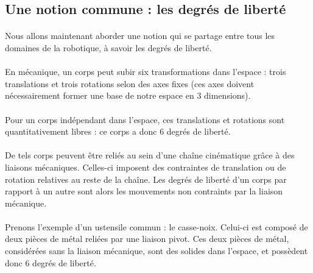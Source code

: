 \documentclass[a4paper,10pt]{article}
\begin{document}
                    
        \subsection{Une notion commune : les degrés de liberté}
            \paragraph{}
                Nous allons maintenant aborder une notion qui se partage 
                entre tous les domaines de la robotique, à savoir les degrés 
                de liberté. 
        
            \paragraph{}
                En mécanique, un corps peut subir six transformations 
                dans l'espace : trois translations et trois rotations
                selon des axes fixes (ces axes doivent nécessairement former 
                une base de notre espace en 3 dimensions).
                
            \paragraph{}
                Pour un corps indépendant dans l'espace, ces translations 
                et rotations sont quantitativement libres : ce corps a donc 
                6 degrés de liberté. 
        
            \paragraph{}
                De tels corps peuvent être reliés au sein d'une chaîne cinématique 
                grâce à des liaisons mécaniques. Celles-ci imposent des contraintes 
                de translation ou de rotation relatives au reste de la chaîne. Les 
                degrés de liberté d'un corps par rapport à un autre sont alors 
                les mouvements non contraints par la liaison mécanique. 
                
            \paragraph{}
                Prenons l'exemple d'un ustensile commun : le casse-noix. Celui-ci est composé de 
                deux pièces de métal reliées par une liaison pivot. Ces deux pièces de métal, 
                considérées sans la liaison mécanique, sont des solides dans l'espace, et 
                possèdent donc 6 degrés de liberté. 
            
\end{document}
